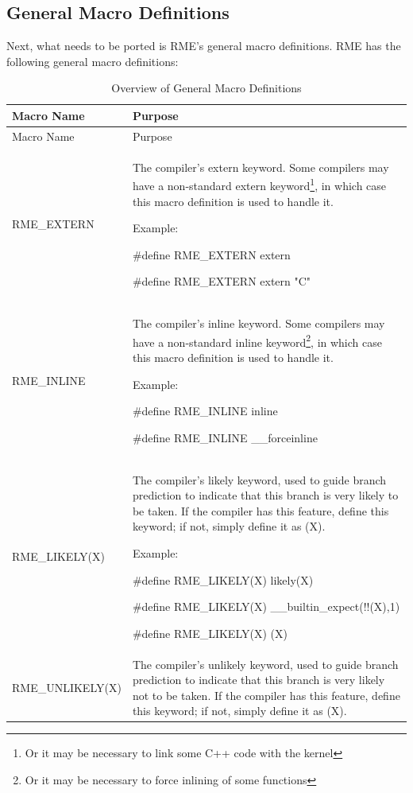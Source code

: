 \subsection{General Macro Definitions}\label{subsec:7-general-macro-definitions}

Next, what needs to be ported is RME's general macro definitions. RME has the following general macro definitions:

\begin{xltabular}{\textwidth}{@{}>{\hsize\raggedright\arraybackslash}X>{\hsize\raggedright\arraybackslash}X@{}}
\caption{Overview of General Macro Definitions}\label{tab:7-2-general-macro-definitions-overview}\\
\toprule
Macro Name & Purpose\tabularnewline
\endfirsthead
\toprule
Macro Name & Purpose\tabularnewline
\midrule
\endhead
\bottomrule
\endlastfoot
RME\_EXTERN\strut
 & The compiler's extern keyword. Some compilers may have a non-standard extern keyword\footnote{Or it may be necessary to link some C++ code with the kernel}, in which case this macro definition is used to handle it.

Example:

\#define RME\_EXTERN extern

\#define RME\_EXTERN extern "C"\strut
\tabularnewline
RME\_INLINE\strut
 & The compiler's inline keyword. Some compilers may have a non-standard inline keyword\footnote{Or it may be necessary to force inlining of some functions}, in which case this macro definition is used to handle it.

Example:

\#define RME\_INLINE inline

\#define RME\_INLINE \_\_forceinline\strut
\tabularnewline
RME\_LIKELY(X)\strut
 & The compiler's likely keyword, used to guide branch prediction to indicate that this branch is very likely to be taken. If the compiler has this feature, define this keyword; if not, simply define it as (X).

Example:

\#define RME\_LIKELY(X) likely(X)

\#define RME\_LIKELY(X) \_\_builtin\_expect(!!(X),1)

\#define RME\_LIKELY(X) (X)\strut
\tabularnewline
RME\_UNLIKELY(X)\strut
 & The compiler's unlikely keyword, used to guide branch prediction to indicate that this branch is very likely not to be taken. If the compiler has this feature, define this keyword; if not, simply define it as (X).


\end{xltabular}
